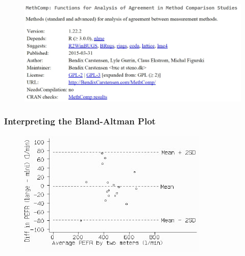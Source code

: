 \documentclass[compress]{beamer}        %
\begin{document}
\begin{frame}
	\begin{figure}
\centering
\includegraphics[width=1.05\linewidth]{CRAN-MethComp}

\end{figure}

\end{frame}
\begin{frame}
	\frametitle{Interpreting the Bland-Altman Plot}
	
	\begin{figure}
\centering
\includegraphics[width=0.95\linewidth]{ba2}
\caption{}
\label{fig:ba2}
\end{figure}

\end{frame}
\end{document}
